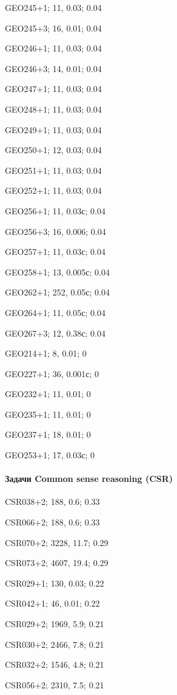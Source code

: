 GEO245+1; 11, 0.03; 0.04

GEO245+3; 16, 0.01; 0.04

GEO246+1; 11, 0.03; 0.04

GEO246+3; 14, 0.01; 0.04

GEO247+1; 11, 0.03; 0.04

GEO248+1; 11, 0.03; 0.04

GEO249+1; 11, 0.03; 0.04

GEO250+1; 12, 0.03; 0.04

GEO251+1; 11, 0.03; 0.04

GEO252+1; 11, 0.03; 0.04

GEO256+1; 11, 0.03с; 0.04

GEO256+3; 16, 0.006; 0.04

GEO257+1; 11, 0.03с; 0.04

GEO258+1; 13, 0.005с; 0.04

GEO262+1; 252, 0.05с; 0.04

GEO264+1; 11, 0.05с; 0.04

GEO267+3; 12, 0.38с; 0.04

GEO214+1; 8, 0.01; 0

GEO227+1; 36, 0.001с; 0

GEO232+1; 11, 0.01; 0

GEO235+1; 11, 0.01; 0

GEO237+1; 18, 0.01; 0

GEO253+1; 17, 0.03с; 0



\paragraph{Задачи Common sense reasoning (CSR)}

CSR038+2; 188, 0.6; 0.33

CSR066+2; 188, 0.6; 0.33


CSR070+2; 3228, 11.7; 0.29

CSR073+2; 4607, 19.4; 0.29



CSR029+1; 130, 0.03; 0.22

CSR042+1; 46, 0.01; 0.22



CSR029+2; 1969, 5.9; 0.21

CSR030+2; 2466, 7.8; 0.21

CSR032+2; 1546, 4.8; 0.21

CSR056+2; 2310, 7.5; 0.21

